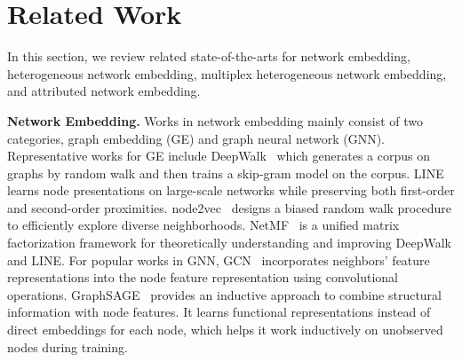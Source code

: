 \documentclass[sigconf]{acmart}
\newcommand{\model}{{\em GATNE}}
\newcommand{\hide}[1]{} \newcommand{\jie}[1]{\textbf{\color{red}[(JT: #1 )]}}  \newcommand{\vpara}[1]{\vspace{0.07in}\noindent\textbf{#1 }}
\begin{document}
\hide{
\vpara{Organization.} The rest of this paper is organized as follows. In Section~\ref{sec:related}, we briefly review the related work. In Section~\ref{sec:problem}, we formally define the problem of attributed multiplex heterogeneous network embedding. In Section~\ref{sec:model}, we introduce \model\ in details. In Section~\ref{sec:exp}, we present the experimental results. Finally, we conclude in Section~\ref{sec:conclusion}.
}

 
\section{Related Work} \label{sec:related}










 




In this section, we review related state-of-the-arts for network embedding, heterogeneous network embedding, multiplex heterogeneous network embedding, and attributed network embedding.



\vpara{Network Embedding.}
Works in network embedding mainly consist of two categories, graph embedding (GE) and graph neural network (GNN). Representative works for GE include 
DeepWalk~\cite{perozzi2014deepwalk} which generates a corpus on graphs by random walk and then trains a skip-gram model on the corpus. LINE~\cite{tang2015line} learns node presentations on large-scale networks while preserving both first-order and second-order proximities. node2vec~\cite{grover2016node2vec} designs a biased random walk procedure to efficiently explore diverse neighborhoods. NetMF~\cite{qiu2018network} is a unified matrix factorization framework for theoretically understanding and improving DeepWalk and LINE.
For popular works in GNN,  GCN~\cite{kipf2017semi} incorporates neighbors' feature representations 
into the node feature representation using convolutional operations.
GraphSAGE~\cite{hamilton2017inductive} provides an inductive approach to combine structural information with node features. It learns functional representations instead of direct embeddings for each node, which helps it work inductively on unobserved nodes during training.
\end{document}
